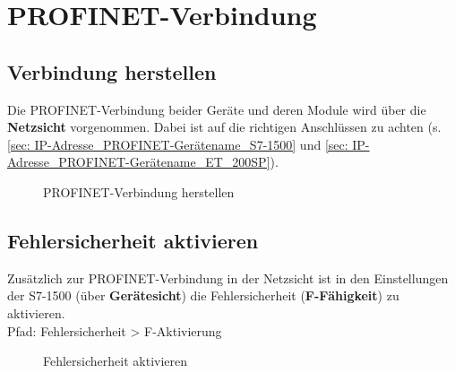 \section{PROFINET-Verbindung} \label{sec:ergebnisse}

\subsection{Verbindung herstellen} \label{sec: Verbindung herstellen}
Die PROFINET-Verbindung beider Geräte und deren Module wird über die \textbf{Netzsicht} vorgenommen. Dabei ist auf die richtigen Anschlüssen zu achten (s. \autoref{sec: IP-Adresse_PROFINET-Gerätename_S7-1500} und \autoref{sec: IP-Adresse_PROFINET-Gerätename_ET_200SP}).

\begin{figure}[H]
   \centering
   \caption[PROFINET-Verbindung herstellen]{PROFINET-Verbindung herstellen}
   \label{fig:Bild5.1}
\end{figure}

\subsection{Fehlersicherheit aktivieren}
Zusätzlich zur PROFINET-Verbindung in der Netzsicht ist in den Einstellungen der S7-1500 (über \textbf{Gerätesicht}) die Fehlersicherheit (\textbf{F-Fähigkeit}) zu aktivieren.\\
Pfad: Fehlersicherheit > F-Aktivierung

\begin{figure}[H]
   \centering
   \caption[Fehlersicherheit aktivieren]{Fehlersicherheit aktivieren}
   \label{fig:Bild5.2}
\end{figure}

